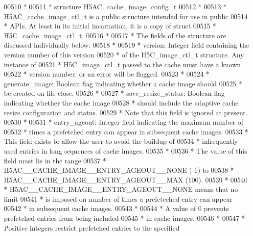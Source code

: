 \begin{DoxyCode}
00510 \textcolor{comment}{ *}
00511 \textcolor{comment}{ * structure H5AC\_cache\_image\_config\_t}
00512 \textcolor{comment}{ *}
00513 \textcolor{comment}{ * H5AC\_cache\_image\_ctl\_t is a public structure intended for use in public }
00514 \textcolor{comment}{ * APIs.  At least in its initial incarnation, it is a copy of struct}
00515 \textcolor{comment}{ * H5C\_cache\_image\_ctl\_t.}
00516 \textcolor{comment}{ *}
00517 \textcolor{comment}{ * The fields of the structure are discussed individually below:}
00518 \textcolor{comment}{ *}
00519 \textcolor{comment}{ * version: Integer field containing the version number of this version}
00520 \textcolor{comment}{ *      of the H5C\_image\_ctl\_t structure.  Any instance of}
00521 \textcolor{comment}{ *      H5C\_image\_ctl\_t passed to the cache must have a known}
00522 \textcolor{comment}{ *      version number, or an error will be flagged.}
00523 \textcolor{comment}{ *}
00524 \textcolor{comment}{ * generate\_image:  Boolean flag indicating whether a cache image should}
00525 \textcolor{comment}{ *      be created on file close.}
00526 \textcolor{comment}{ *}
00527 \textcolor{comment}{ * save\_resize\_status:  Boolean flag indicating whether the cache image }
00528 \textcolor{comment}{ *  should include the adaptive cache resize configuration and status.}
00529 \textcolor{comment}{ *  Note that this field is ignored at present.}
00530 \textcolor{comment}{ *}
00531 \textcolor{comment}{ * entry\_ageout:    Integer field indicating the maximum number of }
00532 \textcolor{comment}{ *  times a prefetched entry can appear in subsequent cache images.}
00533 \textcolor{comment}{ *  This field exists to allow the user to avoid the buildup of }
00534 \textcolor{comment}{ *  infrequently used entries in long sequences of cache images.}
00535 \textcolor{comment}{ *}
00536 \textcolor{comment}{ *  The value of this field must lie in the range}
00537 \textcolor{comment}{ *  H5AC\_\_CACHE\_IMAGE\_\_ENTRY\_AGEOUT\_\_NONE (-1) to }
00538 \textcolor{comment}{ *  H5AC\_\_CACHE\_IMAGE\_\_ENTRY\_AGEOUT\_\_MAX (100).}
00539 \textcolor{comment}{ *}
00540 \textcolor{comment}{ *  H5AC\_\_CACHE\_IMAGE\_\_ENTRY\_AGEOUT\_\_NONE means that no limit }
00541 \textcolor{comment}{ *  is imposed on number of times a prefeteched entry can appear}
00542 \textcolor{comment}{ *  in subsequent cache images.}
00543 \textcolor{comment}{ *}
00544 \textcolor{comment}{ *  A value of 0 prevents prefetched entries from being included }
00545 \textcolor{comment}{ *  in cache images.}
00546 \textcolor{comment}{ *}
00547 \textcolor{comment}{ *  Positive integers restrict prefetched entries to the specified}

\end{DoxyCode}
